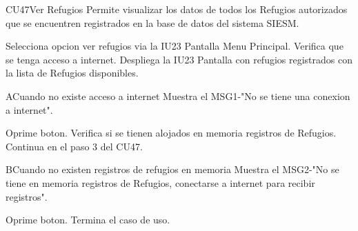 \begin{UseCase}{CU47}{Ver Refugios}{
		Permite visualizar los datos de todos los Refugios autorizados que se encuentren registrados en la base de datos del sistema SIESM.\\
		
}
	
\end{UseCase}



\begin{UCtrayectoria}
	\item \UCactor Selecciona opcion ver refugios via la IU23 Pantalla Menu Principal.
	\UCpaso Verifica que se tenga acceso a internet.
	\UCpaso Despliega la IU23 Pantalla con refugios registrados con la lista de Refugios disponibles.
\end{UCtrayectoria}


\begin{UCtrayectoriaA}{A}{Cuando no existe acceso a internet}
	\UCpaso Muestra el MSG1-"No se tiene una conexion a internet".
	\item \UCactor Oprime boton.
	\UCpaso Verifica si se tienen alojados en memoria registros de Refugios.
	\UCpaso Continua en el paso 3 del CU47.
\end{UCtrayectoriaA}

\begin{UCtrayectoriaA}{B}{Cuando no existen registros de refugios en memoria}
	\UCpaso Muestra el MSG2-"No se tiene en memoria registros de Refugios, conectarse a internet para recibir registros".	
	\item \UCactor Oprime boton.
	\UCpaso[] Termina el caso de uso.
\end{UCtrayectoriaA}